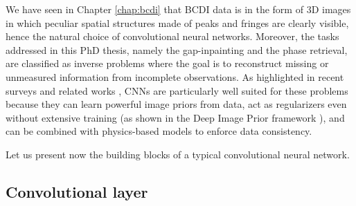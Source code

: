 We have seen in Chapter \ref{chap:bcdi} that BCDI data is in the form of 3D images in which peculiar spatial structures 
made of peaks and fringes are clearly visible, hence the natural choice of convolutional neural networks. Moreover, the 
tasks addressed in this PhD thesis, namely the gap-inpainting and the phase retrieval, are classified as inverse problems 
where the goal is to reconstruct missing or unmeasured information from incomplete observations. As highlighted in recent 
surveys and related works \cite{Review_CNN_2020, CNN_inverse2017}, CNNs are particularly well suited for these problems 
because they can learn powerful image priors from data, act as regularizers even without extensive training 
(as shown in the Deep Image Prior framework \cite{Ulyanov_2020}), and can be combined with physics-based models to 
enforce data consistency.

Let us present now the building blocks of a typical convolutional neural network.

\subsection{Convolutional layer}

